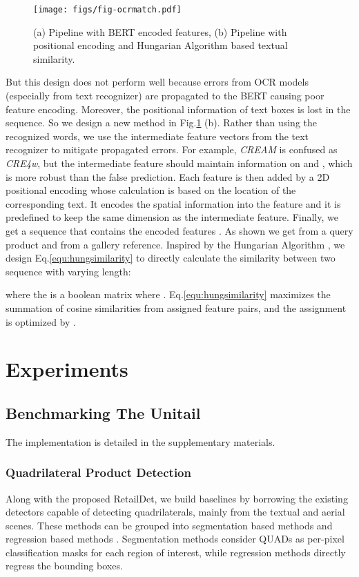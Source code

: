 \documentclass[runningheads]{llncs}
\begin{document}
\begin{figure}[t]
    \centering
    \texttt{[image: figs/fig-ocrmatch.pdf]}
    \caption{(a) Pipeline with BERT encoded features, (b) Pipeline with positional encoding and Hungarian Algorithm based textual similarity.}
    \label{fig:similarity}
\end{figure}

But this design does not perform well because errors from OCR models (especially from text recognizer) are propagated to the BERT causing poor feature encoding. Moreover, the positional information of text boxes is lost in the sequence. So we design a new method in Fig.\ref{fig:similarity} (b). Rather than using the  recognized words, we use the  intermediate feature vectors from the text recognizer to mitigate propagated errors. For example, \textit{CREAM} is confused as \textit{CRE4w}, but the intermediate feature should maintain information on  and , which is more robust than the false prediction. Each feature is then added by a 2D positional encoding\cite{ImageTransformer,DETR} whose calculation is based on the location of the corresponding text. It encodes the spatial information into the feature and it is predefined to keep the same dimension as the intermediate feature. Finally, we get a sequence that contains the  encoded features . As shown we get  from a query product and  from a gallery reference. Inspired by the Hungarian Algorithm \cite{hungarian_algorithm}, we design Eq.\ref{equ:hungsimilarity} to directly calculate the similarity between two sequence with varying length:



\noindent where the  is a  boolean matrix where . Eq.\ref{equ:hungsimilarity} maximizes the summation of cosine similarities from assigned feature pairs, and the assignment is optimized by .

\section{Experiments}
\subsection{Benchmarking The Unitail}
The implementation is detailed in the supplementary materials.
\subsubsection{Quadrilateral Product Detection} 
Along with the proposed RetailDet, we build baselines by borrowing the existing detectors capable of detecting quadrilaterals, mainly from the textual and aerial scenes\cite{DOTA2021}. These methods can be grouped into segmentation based methods \cite{FCENet2021,PANet2019,PSENet2019,DBNet2020,he2017mask} and regression based methods \cite{RIDet,xu2019gliding,RSDet}. Segmentation methods consider QUADs as per-pixel classification masks for each region of interest, while regression methods directly regress the bounding boxes. 
\end{document}
